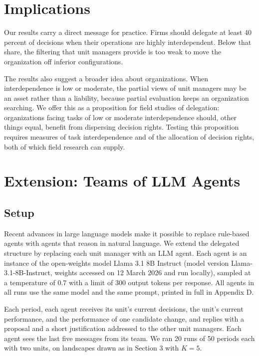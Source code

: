 \documentclass[11pt]{article}
\begin{document}
\section{Implications}

Our results carry a direct message for practice. Firms should delegate at least 40 percent of decisions when their operations are highly interdependent. Below that share, the filtering that unit managers provide is too weak to move the organization off inferior configurations.

The results also suggest a broader idea about organizations. When interdependence is low or moderate, the partial views of unit managers may be an asset rather than a liability, because partial evaluation keeps an organization searching. We offer this as a proposition for field studies of delegation: organizations facing tasks of low or moderate interdependence should, other things equal, benefit from dispersing decision rights. Testing this proposition requires measures of task interdependence and of the allocation of decision rights, both of which field research can supply.

\section{Extension: Teams of LLM Agents}

\subsection{Setup}

Recent advances in large language models make it possible to replace rule-based agents with agents that reason in natural language. We extend the delegated structure by replacing each unit manager with an LLM agent. Each agent is an instance of the open-weights model Llama 3.1 8B Instruct (model version Llama-3.1-8B-Instruct, weights accessed on 12 March 2026 and run locally), sampled at a temperature of 0.7 with a limit of 300 output tokens per response. All agents in all runs use the same model and the same prompt, printed in full in Appendix D.

Each period, each agent receives its unit's current decisions, the unit's current performance, and the performance of one candidate change, and replies with a proposal and a short justification addressed to the other unit managers. Each agent sees the last five messages from its team. We ran 20 runs of 50 periods each with two units, on landscapes drawn as in Section 3 with $K = 5$.
\end{document}
